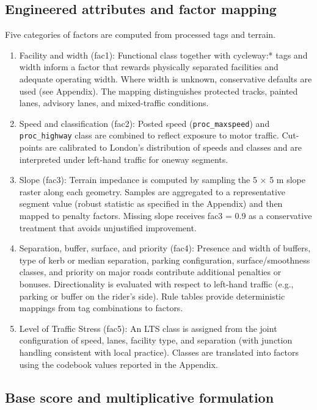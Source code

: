 \documentclass[
  12pt,
  oneside]{book}
\begin{document}
\subsection{Engineered attributes and factor mapping}\label{engineered-attributes-and-factor-mapping}

Five categories of factors are computed from processed tags and terrain.

\begin{enumerate}
\def\labelenumi{\arabic{enumi}.}
\item
  Facility and width (fac1): Functional class together with cycleway:* tags and width inform a factor that rewards physically separated facilities and adequate operating width. Where width is unknown, conservative defaults are used (see Appendix). The mapping distinguishes protected tracks, painted lanes, advisory lanes, and mixed-traffic conditions.
\item
  Speed and classification (fac2): Posted speed (\texttt{proc\_maxspeed}) and \texttt{proc\_highway} class are combined to reflect exposure to motor traffic. Cut-points are calibrated to London's distribution of speeds and classes and are interpreted under left-hand traffic for oneway segments.
\item
  Slope (fac3): Terrain impedance is computed by sampling the 5 × 5 m slope raster along each geometry. Samples are aggregated to a representative segment value (robust statistic as specified in the Appendix) and then mapped to penalty factors. Missing slope receives fac3 = 0.9 as a conservative treatment that avoids unjustified improvement.
\item
  Separation, buffer, surface, and priority (fac4): Presence and width of buffers, type of kerb or median separation, parking configuration, surface/smoothness classes, and priority on major roads contribute additional penalties or bonuses. Directionality is evaluated with respect to left-hand traffic (e.g., parking or buffer on the rider's side). Rule tables provide deterministic mappings from tag combinations to factors.
\item
  Level of Traffic Stress (fac5): An LTS class is assigned from the joint configuration of speed, lanes, facility type, and separation (with junction handling consistent with local practice). Classes are translated into factors using the codebook values reported in the Appendix.
\end{enumerate}

\subsection{Base score and multiplicative formulation}\label{base-score-and-multiplicative-formulation}
\end{document}
